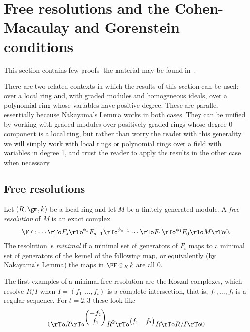 \section{Free resolutions and the Cohen-Macaulay and Gorenstein conditions}
This section contains few proofs; the material may be found in~\cite[Chapter ****]{Eisenbud1995}.

\begin{remark}
 There are two related contexts in which the results of this section can be used: over a local ring and, with graded modules and homogeneous ideals, over a polynomial ring whose variables have positive degree. These are parallel essentially because Nakayama's Lemma works in both cases. They can be unified by working with graded modules over positively graded rings whose degree 0 component is a local ring, but rather than worry the reader with this generality we will simply work with local rings or polynomial rings over a field with variables in degree 1, and trust the reader to apply the results in the other case when necessary.
\end{remark}

\subsection{Free resolutions}
Let $(R,\gm, k)$ be a local ring and let $M$ be a finitely generated module. A \emph{free resolution} of $M$ is an exact complex
$$
\FF: \cdots \rTo F_s \rTo^{\phi_s} F_{s-1} \rTo^{\phi_{s-1}} \cdots \rTo F_1 \rTo^{\phi_1}  F_0 \rTo M \rTo 0.
$$
The resolution is \emph{minimal} if a minimal set of generators of $F_i$ maps to a minimal set of generators of the kernel of the following map,
or equivalently (by Nakayama's Lemma) the maps in $\FF\otimes_R k$ are all 0.

The first examples of a minimal free resolution are the Koszul complexes, which resolve $R/I$ when
 $I = (f_1,\dots, f_t)$
is a complete intersection, that is, $f_1,\dots, f_t$ is a regular sequence.  For $t = 2,3$ these look like
$$
\begin{aligned}
 0\rTo &R \rTo^{
\begin{pmatrix}
-f_2\\f_1
\end{pmatrix}}
 R^2\rTo^{
 \begin{pmatrix}
f_1&f_2
\end{pmatrix}}
 R \rTo R/I \rTo 0\\
 \end{aligned}
 $$
 
